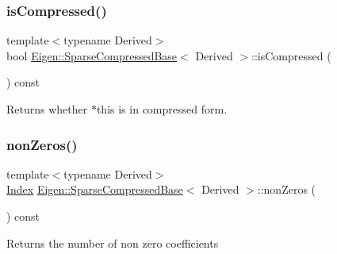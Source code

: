 \subsubsection{\texorpdfstring{isCompressed()}{isCompressed()}}
{\footnotesize\ttfamily template$<$typename Derived$>$ \\
bool \mbox{\hyperlink{class_eigen_1_1_sparse_compressed_base}{Eigen\+::\+Sparse\+Compressed\+Base}}$<$ Derived $>$\+::is\+Compressed (\begin{DoxyParamCaption}{ }\end{DoxyParamCaption}) const\hspace{0.3cm}{\ttfamily [inline]}}

\begin{DoxyReturn}{Returns}
whether {\ttfamily $\ast$this} is in compressed form. 
\end{DoxyReturn}
\mbox{\label{class_eigen_1_1_sparse_compressed_base_a03de8b3da2c142ce8698a76123b3e7d3}} 
\subsubsection{\texorpdfstring{nonZeros()}{nonZeros()}}
{\footnotesize\ttfamily template$<$typename Derived$>$ \\
\mbox{\hyperlink{struct_eigen_1_1_eigen_base_a554f30542cc2316add4b1ea0a492ff02}{Index}} \mbox{\hyperlink{class_eigen_1_1_sparse_compressed_base}{Eigen\+::\+Sparse\+Compressed\+Base}}$<$ Derived $>$\+::non\+Zeros (\begin{DoxyParamCaption}{ }\end{DoxyParamCaption}) const\hspace{0.3cm}{\ttfamily [inline]}}

\begin{DoxyReturn}{Returns}
the number of non zero coefficients 
\end{DoxyReturn}
\mbox{\label{class_eigen_1_1_sparse_compressed_base_a2624d4c2661c582de168246c56e8d71e}} 
